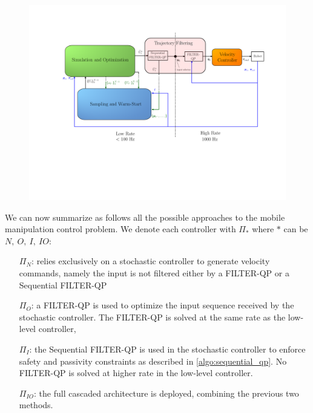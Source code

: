 \begin{figure}[t!]
\centering
\hspace*{-0.7cm}
\includegraphics[width=1.3\columnwidth]{figures/schemes/receding_horizon_new_paper.pdf}
\caption{} \label{fig:block_scheme}
\end{figure}

We can now summarize as follows all the possible approaches to the mobile manipulation control problem. We denote each controller with $\Pi_{*}$ where $*$ can be $N,\ O,\ I,\ IO$:
\begin{itemize}
    \item[$\Pi_{N}$:] relies exclusively on a stochastic controller to generate velocity commands, namely the input is not filtered either by a FILTER-QP or a Sequential FILTER-QP
    \item[$\Pi_{O}$:] a FILTER-QP is used to optimize the input sequence received by the stochastic controller. The FILTER-QP is solved at the same rate as the low-level controller,
    \item[$\Pi_{I}$:] the Sequential FILTER-QP is used in the stochastic controller to enforce safety and passivity constraints  as described in \algo \ref{algo:sequential_qp}. No FILTER-QP is solved at higher rate in the low-level controller.
    \item[$\Pi_{IO}$:] the full cascaded architecture is deployed, combining the previous two methods.
\end{itemize}

